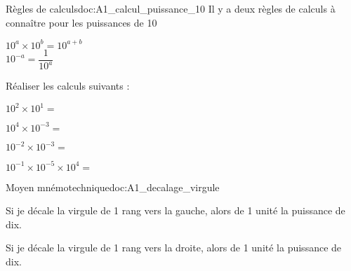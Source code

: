 \pasCorrection{\vspace*{-26pt}}
\begin{doc}{Règles de calculs}{doc:A1_calcul_puissance_10}
  Il y a deux règles de calculs à connaître pour les puissances de 10
  \begin{importants}
    \pointCyan $10^a \times 10^b = 10^{a + b}$ \\   
    \pointCyan $10^{-a} = \dfrac{1}{10^a}$
  \end{importants}
\end{doc}


\numeroQuestion Réaliser les calculs suivants :
\pasCorrection{\vspace*{-4pt}}
\begin{listePoints}[2]
  \setlength\itemsep{-4pt}
  \item $10^2 \times 10^1 =$ 
  \item $10^4 \times 10^{-3} =$ 
  \item $10^{-2} \times 10^{-3} =$ 
  \item $10^{-1} \times 10^{-5} \times 10^4 =$ 
\end{listePoints}


\pasCorrection{\vspace*{-26pt}}
\begin{doc}{Moyen mnémotechnique}{doc:A1_decalage_virgule}
  \begin{listePoints}
    \setlength\itemsep{-4pt}
    \item Si je décale la virgule de 1 rang vers la gauche, alors
     de 1 unité la puissance de dix. 
    \item Si je décale la virgule de 1 rang vers la droite, alors
     de 1 unité la puissance de dix. 
  \end{listePoints}
\end{doc}


\newpage
\vspace*{-36pt}


